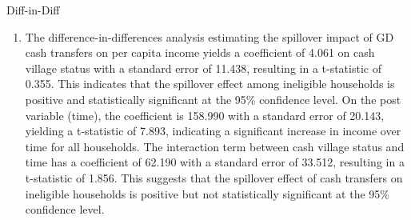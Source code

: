\begin{homeworkProblem}{Diff-in-Diff}
\begin{solution}
\begin{enumerate}
\begin{enumerate}
                    For the regression of having an elderly member on cash
                    village status at baseline, the coefficient is -0.026 with
                    a standard error of 0.024, yielding a t-statistic of -1.100.
                    This suggests that there is a marginally significant 
                    difference in the proportion of households with elderly
                    members between cash and control villages at baseline.

                    Taken together, these findings suggest that ineligible
                    households are relatively similar in cash villages versus
                    control villages along these two dimensions, which supports
                    the validity of the difference-in-differences approach.
                \item The difference-in-differences analysis estimating the
                    spillover impact of GD cash transfers on per capita income
                    yields a coefficient of 4.061 on cash village status with 
                    a standard error of 11.438, resulting in a t-statistic of 
                    0.355. This indicates that the spillover effect among 
                    ineligible households is positive and statistically 
                    significant at the 95\% confidence level. On the post 
                    variable (time), the coefficient is 158.990 with a standard 
                    error of 20.143, yielding a t-statistic of 7.893, 
                    indicating a significant increase in income over time for 
                    all households. The interaction term between cash village 
                    status and time has a coefficient of 62.190 with a standard 
                    error of 33.512, resulting in a t-statistic of 1.856. This
                    suggests that the spillover effect of cash transfers on
                    ineligible households is positive but not statistically
                    significant at the 95\% confidence level.
                

\end{enumerate}
\end{enumerate}
\end{solution}
\end{homeworkProblem}
